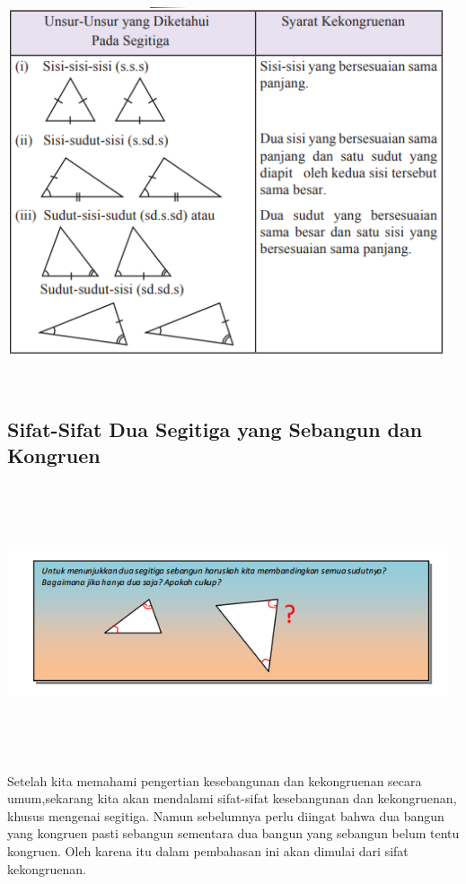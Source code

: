 \documentclass[11pt,fleqn]{book} %
\begin{document}
\includegraphics[width = 13cm, height= 12cm]{Pictures/a21.png}

\subsection{Sifat-Sifat Dua Segitiga yang Sebangun dan Kongruen}
\includegraphics[width = 13cm, height= 8cm]{Pictures/a25.png}

Setelah kita memahami pengertian kesebangunan dan kekongruenan secara umum,sekarang kita akan mendalami sifat-sifat kesebangunan dan kekongruenan, khusus mengenai segitiga. Namun sebelumnya perlu diingat bahwa dua bangun yang kongruen pasti sebangun sementara dua bangun yang sebangun belum tentu kongruen. Oleh karena itu dalam pembahasan ini akan dimulai dari sifat kekongruenan.
\end{document}
